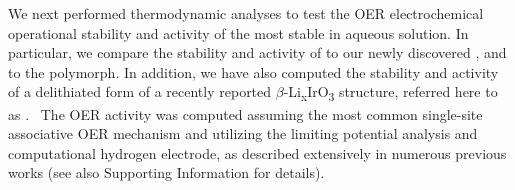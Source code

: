 %



%
%
We next performed  thermodynamic analyses to test the OER electrochemical operational stability and activity of the most stable \IrOx in aqueous solution.
%
In particular, we compare the stability and activity of \rIrOtwo to our newly discovered \aIrOthree, and to the \rIrOthree polymorph.
%
In addition, we have also computed the stability and activity of a delithiated form of a recently reported $\beta$-Li\textsubscript{x}IrO\textsubscript{3} structure, referred here to as \bIrOthree.~\cite{Pearce2017,Pearce2019}
%
The OER activity was computed assuming the most common single-site associative OER mechanism and utilizing the limiting potential analysis and computational hydrogen electrode, as described extensively in numerous previous works\cite{Man2011,Rossmeisl2007,Kitchin2004, Bajdich2013} (see also Supporting Information for details).



